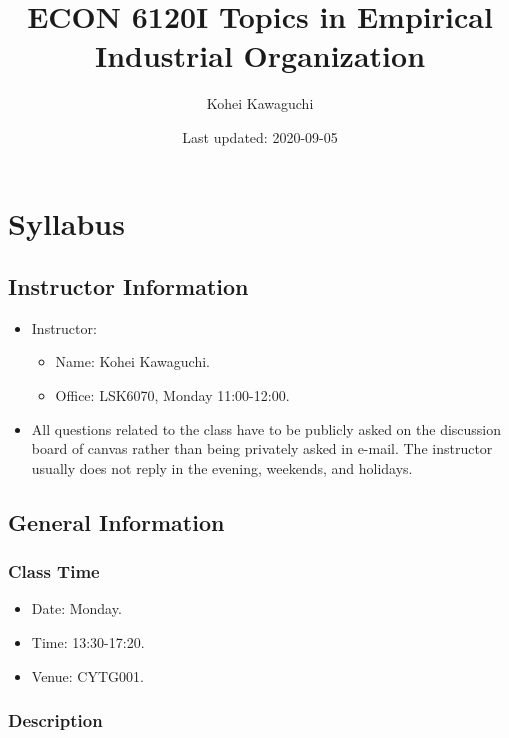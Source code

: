 \documentclass[
]{book}
\title{ECON 6120I Topics in Empirical Industrial Organization}
\author{Kohei Kawaguchi}
\date{Last updated: 2020-09-05}
\providecommand{\tightlist}{%
  \setlength{\itemsep}{0pt}\setlength{\parskip}{0pt}}
\begin{document}
\maketitle

{
\setcounter{tocdepth}{1}
\tableofcontents
}
\hypertarget{syllabus}{%
\chapter{Syllabus}\label{syllabus}}

\hypertarget{instructor-information}{%
\section{Instructor Information}\label{instructor-information}}

\begin{itemize}
\tightlist
\item
  Instructor:

  \begin{itemize}
  \tightlist
  \item
    Name: Kohei Kawaguchi.
  \item
    Office: LSK6070, Monday 11:00-12:00.
  \end{itemize}
\item
  All questions related to the class have to be publicly asked on the discussion board of canvas rather than being privately asked in e-mail. The instructor usually does not reply in the evening, weekends, and holidays.
\end{itemize}

\hypertarget{general-information}{%
\section{General Information}\label{general-information}}

\hypertarget{class-time}{%
\subsection{Class Time}\label{class-time}}

\begin{itemize}
\tightlist
\item
  Date: Monday.
\item
  Time: 13:30-17:20.
\item
  Venue: CYTG001.
\end{itemize}

\hypertarget{description}{%
\subsection{Description}\label{description}}
\end{document}
